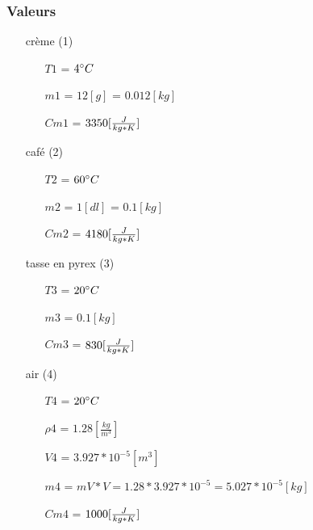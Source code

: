 \subsubsection{Valeurs}
\begin{itemize}
    \item[crème] (1)
    \item[] 
    \begin{itemize}
        \item[$T1$] = $4\celsius$
        \item[$m1$] = $12[g]$ = $0.012[kg]$
        \item[$Cm1$] = $3350[\cm]$
    \end{itemize} 
    \item[café] (2)
    \item[] 
    \begin{itemize}
        \item[$T2$] = $60\celsius$
        \item[$m2$] = $1[dl]$ = $0.1[kg]$
        \item[$Cm2$] = $4180[\cm]$   
    \end{itemize} 
    \item[tasse en pyrex] (3)
    \item[] 
    \begin{itemize}
        \item[$T3$] = $20\celsius$
        \item[$m3$] = $0.1[kg]$
        \item[$Cm3$] = $830[\cm]$   
    \end{itemize} 
    \item[air] (4)
    \item[] 
    \begin{itemize}
        \item[$T4$] = $20\celsius$
        \item[${\rho}4$] = $1.28[\frac{kg}{m^3}]$
        \item[$V4$] = $3.927*10^{-5} [m^3]$ 
        \item[$m4$] = $mV * V = 1.28 * 3.927*10^{-5} = 5.027*10^{-5}[kg]$
        \item[$Cm4$] = $1000[\cm]$   
    \end{itemize} 
\end{itemize}
